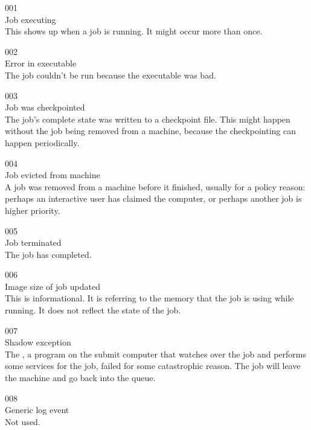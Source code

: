 \noindent{} 001 \\
 Job executing \\
 This shows up when a job is running.
It might occur more than once.

\noindent{} 002 \\
 Error in executable \\
 The job couldn't be run because the
executable was bad.

\noindent{} 003 \\
 Job was checkpointed \\
 The job's complete state was written to a checkpoint
file.  
This might happen without the job being removed from a machine,
because the checkpointing can happen periodically. 

\noindent{} 004 \\
 Job evicted from machine \\
 A job was removed from a machine before it finished,
usually for a policy reason: perhaps an interactive user has claimed
the computer, or perhaps another job is higher priority.

\noindent{} 005 \\
 Job terminated \\
 The job has completed.

\noindent{} 006 \\
 Image size of job updated \\
 This is informational. 
It is referring to the memory that the job is using while running. It
does not reflect the state of the job.

\noindent{} 007 \\
 Shadow exception \\
The , a program on the submit computer that watches
over the job and performs some services for the job, failed for some
catastrophic reason. The job will leave the machine and go back into
the queue.

\noindent{} 008 \\
 Generic log event \\
 Not used.

